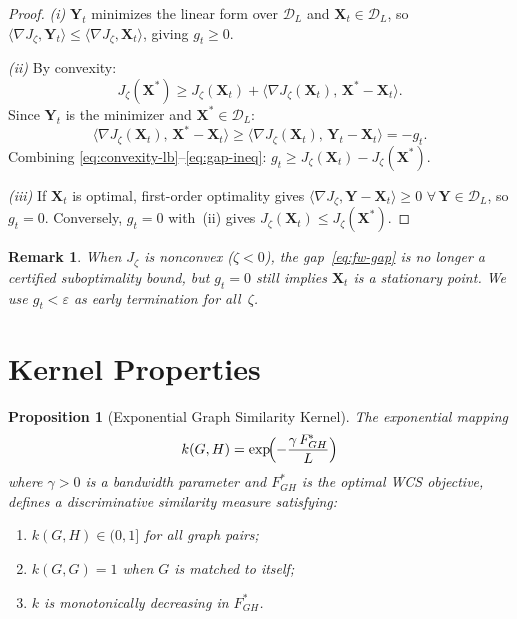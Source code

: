 \documentclass[conference]{IEEEtran}
\newtheorem{proposition}{Proposition}
\newtheorem{remark}{Remark}
\begin{document}
\begin{proof}
\emph{(i)}
$\mathbf{Y}_t$ minimizes the linear form over $\mathcal{D}_L$
and $\mathbf{X}_t \!\in\! \mathcal{D}_L$, so
$\langle\nabla J_\zeta,\mathbf{Y}_t\rangle
 \leq \langle\nabla J_\zeta,\mathbf{X}_t\rangle$,
giving $g_t \geq 0$.

\emph{(ii)}
By convexity:
\begin{equation}
J_\zeta(\mathbf{X}^{\!*})
  \geq J_\zeta(\mathbf{X}_t)
  + \bigl\langle\nabla J_\zeta(\mathbf{X}_t),\,
    \mathbf{X}^{\!*}\!-\!\mathbf{X}_t\bigr\rangle.
\label{eq:convexity-lb}
\end{equation}
Since $\mathbf{Y}_t$ is the minimizer and
$\mathbf{X}^{\!*}\!\in\!\mathcal{D}_L$:
\begin{equation}
\bigl\langle\nabla J_\zeta(\mathbf{X}_t),\,
  \mathbf{X}^{\!*}\!-\!\mathbf{X}_t\bigr\rangle
\geq \bigl\langle\nabla J_\zeta(\mathbf{X}_t),\,
  \mathbf{Y}_t\!-\!\mathbf{X}_t\bigr\rangle
= -g_t.
\label{eq:gap-ineq}
\end{equation}
Combining \eqref{eq:convexity-lb}--\eqref{eq:gap-ineq}:
$g_t \geq J_\zeta(\mathbf{X}_t) - J_\zeta(\mathbf{X}^{\!*})$.

\emph{(iii)}
If $\mathbf{X}_t$ is optimal, first-order optimality gives
$\langle\nabla J_\zeta,\mathbf{Y}\!-\!\mathbf{X}_t\rangle \!\geq\! 0$
$\forall\,\mathbf{Y}\!\in\!\mathcal{D}_L$, so $g_t = 0$.
Conversely, $g_t = 0$ with~(ii) gives
$J_\zeta(\mathbf{X}_t) \leq J_\zeta(\mathbf{X}^{\!*})$.
\end{proof}

\begin{remark}
When $J_\zeta$ is nonconvex ($\zeta \!<\! 0$),
the gap~\eqref{eq:fw-gap} is no longer a certified
suboptimality bound, but $g_t = 0$ still implies
$\mathbf{X}_t$ is a stationary point.
We use $g_t < \varepsilon$ as early termination for all~$\zeta$.
\end{remark}


\section{Kernel Properties}
\label{sec:kernel}

\begin{proposition}[Exponential Graph Similarity Kernel]
\label{prop:psd}
The exponential mapping
\begin{equation}
k(G, H) = \exp\!\Bigl(-\frac{\gamma\, F^{\!*}_{GH}}{L}\Bigr)
\label{eq:kernel}
\end{equation}
where $\gamma > 0$ is a bandwidth parameter and $F^{\!*}_{GH}$
is the optimal WCS objective, defines a discriminative
similarity measure satisfying:
\begin{enumerate}
\item $k(G, H) \in (0, 1]$ for all graph pairs;
\item $k(G, G) = 1$ when $G$ is matched to itself;
\item $k$ is monotonically decreasing in $F^{\!*}_{GH}$.
\end{enumerate}
\end{proposition}
\end{document}
